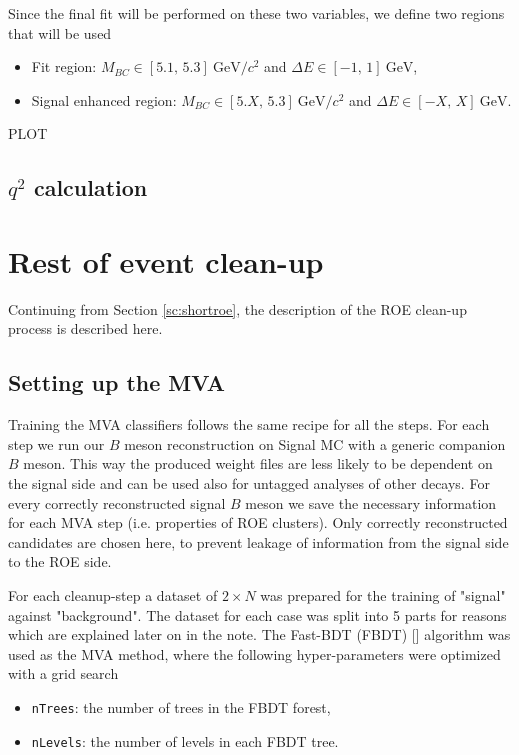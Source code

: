 \documentclass[oneside,a4paper,openany,12pt]{scrbook}
\newcommand {\e}[1]{\mathrm{~#1}}
\begin{document}
Since the final fit will be performed on these two variables, we define two regions that will be used
\begin{itemize}
\item Fit region: $M_{BC} \in [5.1,\,5.3]\e{GeV}/c^2$ and $\Delta E \in [-1,\,1]\e{GeV}$,
\item Signal enhanced region: $M_{BC} \in [5.X,\,5.3]\e{GeV}/c^2$ and $\Delta E \in [-X,\,X]\e{GeV}$.
\end{itemize}

\begin{center}
PLOT
\end{center}

\section{$q^2$ calculation}

\chapter{Rest of event clean-up}
\label{ch:roe}

Continuing from Section \ref{sc:shortroe}, the description of the ROE clean-up process is described here. 

\section{Setting up the MVA}

Training the MVA classifiers follows the same recipe for all the steps. For each step we run our $B$ meson reconstruction on Signal MC with a generic companion $B$ meson. This way the produced weight files are less likely to be dependent on the signal side and can be used also for untagged analyses of other decays. For every correctly reconstructed signal $B$ meson we save the necessary information for each MVA step (i.e. properties of ROE clusters). Only correctly reconstructed candidates are chosen here, to prevent leakage of information from the signal side to the ROE side.

For each cleanup-step a dataset of $2\times N$ was prepared for the training of "signal" against "background". The dataset for each case was split into 5 parts for reasons which are explained later on in the note. The Fast-BDT (FBDT) [] algorithm was used as the MVA method, where the following hyper-parameters were optimized with a grid search
\begin{itemize}
\item \texttt{nTrees}: the number of trees in the FBDT forest,
\item \texttt{nLevels}: the number of levels in each FBDT tree.
\end{itemize}
\end{document}
